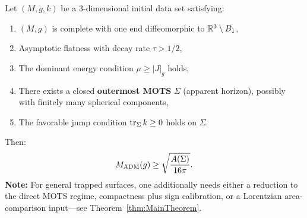 \begin{theorem}\label{thm:UnconditionalPenrose}
Let $(M, g, k)$ be a 3-dimensional initial data set satisfying:
\begin{enumerate}
    \item $(M, g)$ is complete with one end diffeomorphic to $\mathbb{R}^3 \setminus B_1$,
    \item Asymptotic flatness with decay rate $\tau > 1/2$,
    \item The dominant energy condition $\mu \ge |J|_g$ holds,
    \item There exists a closed \textbf{outermost MOTS} $\Sigma$ (apparent horizon), possibly with finitely many spherical components,
    \item The favorable jump condition $\operatorname{tr}_\Sigma k \ge 0$ holds on $\Sigma$.
\end{enumerate}
Then:
\begin{equation}
    M_{\mathrm{ADM}}(g) \ge \sqrt{\frac{A(\Sigma)}{16\pi}}.
\end{equation}
\textbf{Note:} For general trapped surfaces, one additionally needs either a reduction to the direct MOTS regime, compactness plus sign calibration, or a Lorentzian area-comparison input---see Theorem~\ref{thm:MainTheorem}.
\end{theorem}

